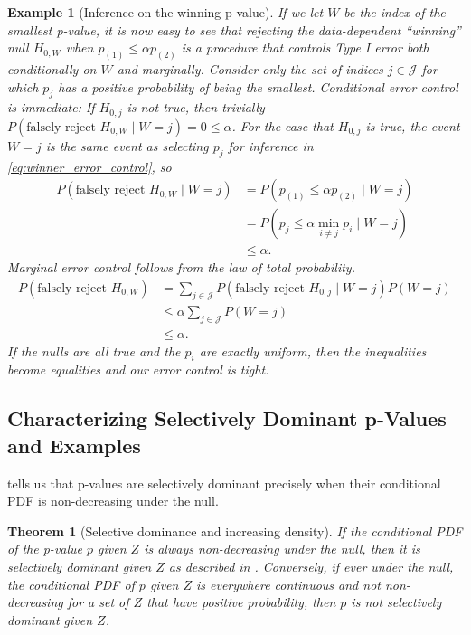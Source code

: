 \documentclass{article}
\newtheorem{example}{Example}
\newtheorem{theorem}{Theorem}
\begin{document}
\begin{example}[Inference on the winning p-value]
    If we let $W$ be the index of the smallest p-value, it is now easy to see that rejecting the data-dependent ``winning'' null $H_{0, W}$ when $p_{(1)} \leq \alpha p_{(2)}$ is a procedure that controls Type I error both conditionally on $W$ and marginally. Consider only the set of indices $j \in \mathcal{J}$ for which $p_j$ has a positive probability of being the smallest. Conditional error control is immediate: If $H_{0, j}$ is not true, then trivially $P(\text{falsely reject } H_{0, W} \mid W = j) = 0 \leq \alpha$. For the case that $H_{0, j}$ is true, the event $W=j$ is the same event as selecting $p_j$ for inference in \eqref{eq:winner_error_control}, so 
    \begin{align*}
        P(\text{falsely reject } H_{0, W} \mid W = j) &= P(p_{(1)} \leq \alpha p_{(2)} \mid W = j)\\
        &= P(p_j \leq \alpha \min_{i \neq j} p_i \mid W = j)\\
        &\leq \alpha.
    \end{align*}
     Marginal error control follows from the law of total probability. 
    \begin{align*}
        P(\text{falsely reject } H_{0, W}) &= \sum_{j \in \mathcal{J}} P(\text{falsely reject } H_{0, j} \mid W = j)P(W=j) \\
                                          &\leq \alpha \sum_{j \in \mathcal{J}} P(W=j)\\
                                          &\leq \alpha. 
    \end{align*}
    If the nulls are all true and the $p_i$ are exactly uniform, then the inequalities become equalities and our error control is tight. 
\end{example}

\subsection{Characterizing Selectively Dominant p-Values and Examples}

 tells us that p-values are selectively dominant precisely when their conditional PDF is non-decreasing under the null. 

\begin{theorem}[Selective dominance and increasing density]
    \label{thm:density}
    If the conditional PDF of the p-value $p$ given $Z$ is always non-decreasing under the null, then it is selectively dominant given $Z$ as described in . Conversely, if ever under the null, the conditional PDF of $p$ given $Z$ is everywhere continuous and not non-decreasing for a set of $Z$ that have positive probability, then $p$ is not selectively dominant given $Z$.  
\end{theorem}
\end{document}
